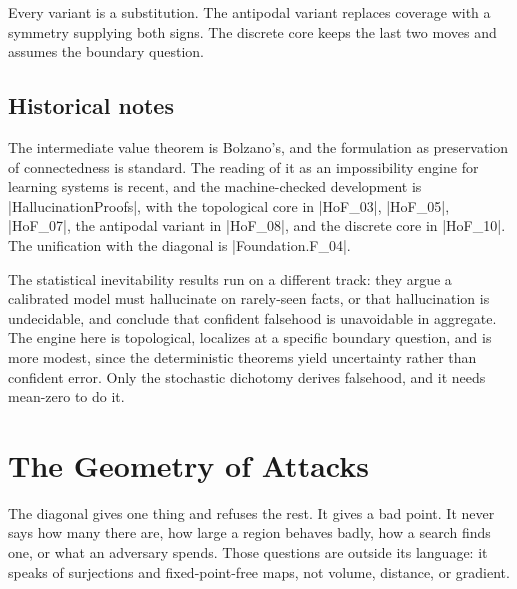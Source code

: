 \documentclass{memoir}
\begin{document}
Every variant is a substitution. The antipodal variant replaces coverage with a
symmetry supplying both signs. The discrete core keeps the last two moves and
assumes the boundary question.



\section{Historical notes}\label{Two--Schemas--of--Impossibility-005F-005F-005F--Machine--Checked--Limits--of--Trustworthy--Machine--Learning-005F-005F-005F--and--Why--They--Tighten--with--Capability----From--Logic--to--Analysis----Historical--notes}

The intermediate value theorem is Bolzano's, and the formulation as preservation
of connectedness is standard. The reading of it as an impossibility engine for
learning systems is recent, and the machine-checked development is
\LeanVerb|HallucinationProofs|, with the topological core in \LeanVerb|HoF_03|, \LeanVerb|HoF_05|,
\LeanVerb|HoF_07|, the antipodal variant in \LeanVerb|HoF_08|, and the discrete core in \LeanVerb|HoF_10|.
The unification with the diagonal is \LeanVerb|Foundation.F_04|.

The statistical inevitability results run on a different track: they argue a
calibrated model must hallucinate on rarely-seen facts, or that hallucination is
undecidable, and conclude that confident falsehood is unavoidable in aggregate.
The engine here is topological, localizes at a specific boundary question, and
is more modest, since the deterministic theorems yield uncertainty rather than
confident error. Only the stochastic dichotomy derives falsehood, and it needs
mean-zero to do it.





\chapter{The Geometry of Attacks}\label{Two--Schemas--of--Impossibility-005F-005F-005F--Machine--Checked--Limits--of--Trustworthy--Machine--Learning-005F-005F-005F--and--Why--They--Tighten--with--Capability----The--Geometry--of--Attacks}

The diagonal gives one thing and refuses the rest. It gives a bad point. It
never says how many there are, how large a region behaves badly, how a search
finds one, or what an adversary spends. Those questions are outside its
language: it speaks of surjections and fixed-point-free maps, not volume,
distance, or gradient.
\end{document}
